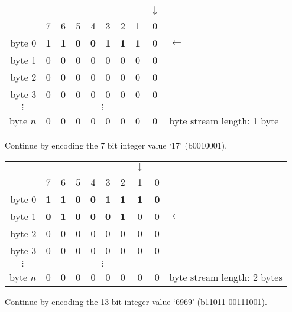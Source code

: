 \documentclass[11pt,letterpaper]{article}
\begin{document}
\begin{tabular}{r|ccccccccl}
\multicolumn{1}{r}{} &&&&&&&&$\downarrow$& \\
         & 7 & 6 & 5 & 4 & 3 & 2 & 1 & 0 & \\\cline{1-9}
byte 0   & \textbf{1} & \textbf{1} & \textbf{0} & \textbf{0} &
           \textbf{1} & \textbf{1} & \textbf{1} & 0 & $\leftarrow$ \\
byte 1   & 0 & 0 & 0 & 0 & 0 & 0 & 0 & 0 &                         \\
byte 2   & 0 & 0 & 0 & 0 & 0 & 0 & 0 & 0 &                         \\
byte 3   & 0 & 0 & 0 & 0 & 0 & 0 & 0 & 0 &                         \\
\multicolumn{1}{c|}{$\vdots$}&\multicolumn{8}{c}{$\vdots$}&        \\
byte $n$ & 0 & 0 & 0 & 0 & 0 & 0 & 0 & 0 &
byte stream length: 1 byte
\end{tabular}
\vspace{\baselineskip}

Continue by encoding the 7 bit integer value `17' (b0010001).

\begin{tabular}{r|ccccccccl}
\multicolumn{1}{r}{} &&&&&&&$\downarrow$&& \\
         & 7 & 6 & 5 & 4 & 3 & 2 & 1 & 0 & \\\cline{1-9}
byte 0   & \textbf{1} & \textbf{1} & \textbf{0} & \textbf{0} &
           \textbf{1} & \textbf{1} & \textbf{1} & \textbf{0} & \\
byte 1   & \textbf{0} & \textbf{1} & \textbf{0} & \textbf{0} &
           \textbf{0} & \textbf{1} & 0 & 0 & $\leftarrow$      \\
byte 2   & 0 & 0 & 0 & 0 & 0 & 0 & 0 & 0 &                     \\
byte 3   & 0 & 0 & 0 & 0 & 0 & 0 & 0 & 0 &                     \\
\multicolumn{1}{c|}{$\vdots$}&\multicolumn{8}{c}{$\vdots$}&    \\
byte $n$ & 0 & 0 & 0 & 0 & 0 & 0 & 0 & 0 &
byte stream length: 2 bytes
\end{tabular}
\vspace{\baselineskip}

Continue by encoding the 13 bit integer value `6969' (b11011 00111001).
\end{document}
